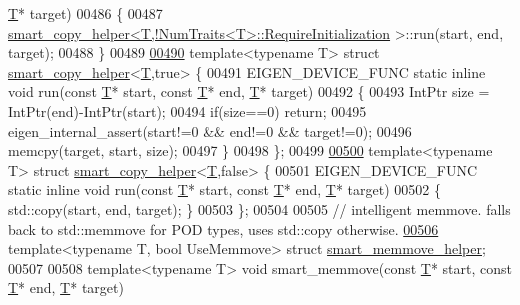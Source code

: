\begin{DoxyCode}
      \hyperlink{group___sparse_core___module}{T}* target)
00486 \{
00487   \hyperlink{struct_eigen_1_1internal_1_1smart__copy__helper}{smart\_copy\_helper<T,!NumTraits<T>::RequireInitialization}
      >::run(start, end, target);
00488 \}
00489 
\hyperlink{struct_eigen_1_1internal_1_1smart__copy__helper_3_01_t_00_01true_01_4}{00490} \textcolor{keyword}{template}<\textcolor{keyword}{typename} T> \textcolor{keyword}{struct }\hyperlink{struct_eigen_1_1internal_1_1smart__copy__helper}{smart\_copy\_helper}<\hyperlink{group___sparse_core___module}{T},true> \{
00491   EIGEN\_DEVICE\_FUNC \textcolor{keyword}{static} \textcolor{keyword}{inline} \textcolor{keywordtype}{void} run(\textcolor{keyword}{const} \hyperlink{group___sparse_core___module}{T}* start, \textcolor{keyword}{const} \hyperlink{group___sparse_core___module}{T}* end, \hyperlink{group___sparse_core___module}{T}* target)
00492   \{
00493     IntPtr size = IntPtr(end)-IntPtr(start);
00494     \textcolor{keywordflow}{if}(size==0) \textcolor{keywordflow}{return};
00495     eigen\_internal\_assert(start!=0 && end!=0 && target!=0);
00496     memcpy(target, start, size);
00497   \}
00498 \};
00499 
\hyperlink{struct_eigen_1_1internal_1_1smart__copy__helper_3_01_t_00_01false_01_4}{00500} \textcolor{keyword}{template}<\textcolor{keyword}{typename} T> \textcolor{keyword}{struct }\hyperlink{struct_eigen_1_1internal_1_1smart__copy__helper}{smart\_copy\_helper}<\hyperlink{group___sparse_core___module}{T},false> \{
00501   EIGEN\_DEVICE\_FUNC \textcolor{keyword}{static} \textcolor{keyword}{inline} \textcolor{keywordtype}{void} run(\textcolor{keyword}{const} \hyperlink{group___sparse_core___module}{T}* start, \textcolor{keyword}{const} \hyperlink{group___sparse_core___module}{T}* end, \hyperlink{group___sparse_core___module}{T}* target)
00502   \{ std::copy(start, end, target); \}
00503 \};
00504 
00505 \textcolor{comment}{// intelligent memmove. falls back to std::memmove for POD types, uses std::copy otherwise. }
\hyperlink{struct_eigen_1_1internal_1_1smart__memmove__helper}{00506} \textcolor{keyword}{template}<\textcolor{keyword}{typename} T, \textcolor{keywordtype}{bool} UseMemmove> \textcolor{keyword}{struct }\hyperlink{struct_eigen_1_1internal_1_1smart__memmove__helper}{smart\_memmove\_helper};
00507 
00508 \textcolor{keyword}{template}<\textcolor{keyword}{typename} T> \textcolor{keywordtype}{void} smart\_memmove(\textcolor{keyword}{const} \hyperlink{group___sparse_core___module}{T}* start, \textcolor{keyword}{const} \hyperlink{group___sparse_core___module}{T}* end, \hyperlink{group___sparse_core___module}{T}* target)

\end{DoxyCode}
